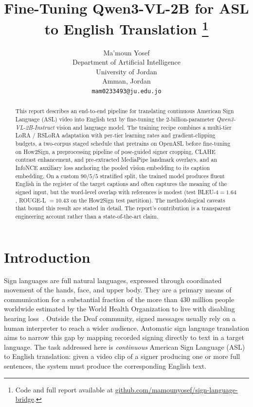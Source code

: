 \documentclass{article}
\title{Fine-Tuning Qwen3-VL-2B for ASL to English Translation%
  \thanks{Code and full report available at
  \href{https://github.com/mamounyosef/sign-language-bridge}{github.com/mamounyosef/sign-language-bridge}.}}
\author{
 Ma'moun Yosef \\
  Department of Artificial Intelligence \\
  University of Jordan \\
  Amman, Jordan \\
  \texttt{mam0233493@ju.edu.jo} \\
}
\begin{document}
\maketitle

\begin{abstract}
This report describes an end-to-end pipeline for translating continuous
American Sign Language (ASL) video into English text by fine-tuning the
$2$-billion-parameter \emph{Qwen3-VL-2B-Instruct} vision and language
model. The training recipe combines a multi-tier LoRA / RSLoRA adaptation
with per-tier learning rates and gradient-clipping budgets, a two-corpus
staged schedule that pretrains on OpenASL before fine-tuning on How2Sign,
a preprocessing pipeline of pose-guided signer cropping, CLAHE contrast
enhancement, and pre-extracted MediaPipe landmark overlays, and an InfoNCE
auxiliary loss anchoring the pooled vision embedding to its caption
embedding. On a custom $90/5/5$ stratified split, the trained model
produces fluent English in the register of the target captions and often
captures the meaning of the signed input, but the word-level overlap with
references is modest (test BLEU-$4 = 1.64$, ROUGE-L $= 10.43$ on the
How2Sign test partition). The methodological caveats that bound this
result are stated in detail. The report's contribution is a transparent
engineering account rather than a state-of-the-art claim.
\end{abstract}




\section{Introduction}
\label{sec:introduction}

Sign languages are full natural languages, expressed through coordinated
movement of the hands, face, and upper body. They are a primary means of
communication for a substantial fraction of the more than $430$ million
people worldwide estimated by the World Health Organization to live with
disabling hearing loss~\cite{who2026deafness}. Outside the Deaf community,
signed messages usually rely on a human interpreter to reach a wider
audience. Automatic sign language translation aims to narrow this gap by
mapping recorded signing directly to text in a target language. The task
addressed here is \emph{continuous} American Sign Language (ASL) to English
translation: given a video clip of a signer producing one or more full
sentences, the system must produce the corresponding English text.
\end{document}
